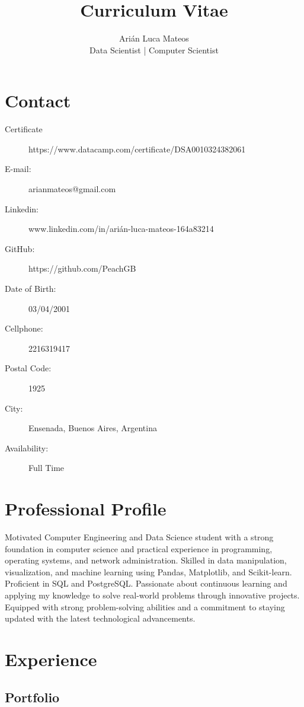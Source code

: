 \documentclass{article}
\title{Curriculum Vitae}
\author{Arián Luca Mateos  \\
\large   Data Scientist | Computer Scientist}
\renewcommand{\maketitle}{
\begin{center}
{\huge\bfseries\theauthor}
\end{center}
}
\begin{document}
\maketitle
\section{Contact}
\begin{description}

\item[Certificate] https://www.datacamp.com/certificate/DSA0010324382061
\item[E-mail:]arianmateos@gmail.com
\item[Linkedin:] www.linkedin.com/in/arián-luca-mateos-164a83214

\item[GitHub:] https://github.com/PeachGB

\item[Date of Birth:]03/04/2001 

\item[Cellphone:]2216319417

\item[Postal Code:]1925

\item[City:]Ensenada, Buenos Aires, Argentina
\item[Availability:] Full Time

\end{description}
\section{Professional Profile}
Motivated Computer Engineering and Data Science student with a strong foundation in computer science and practical experience in programming, operating systems, and network administration. Skilled in data manipulation, visualization, and machine learning using Pandas, Matplotlib, and Scikit-learn. Proficient in SQL and PostgreSQL. Passionate about continuous learning and applying my knowledge to solve real-world problems through innovative projects. Equipped with strong problem-solving abilities and a commitment to staying updated with the latest technological advancements.
\section{Experience}
\subsection{Portfolio}
\end{document}
